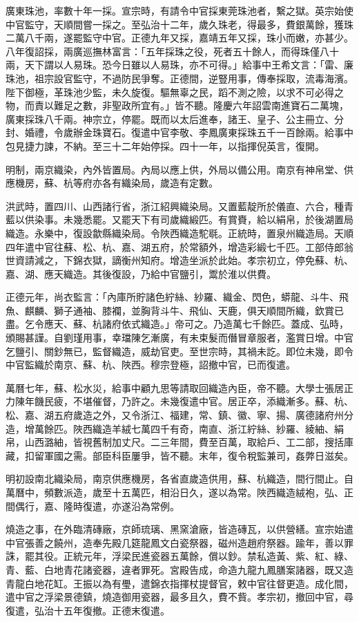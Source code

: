 廣東珠池，率數十年一採。宣宗時，有請令中官採東莞珠池者，繫之獄。英宗始使中官監守，天順間嘗一採之。至弘治十二年，歲久珠老，得最多，費銀萬餘，獲珠二萬八千兩，遂罷監守中官。正德九年又採，嘉靖五年又採，珠小而嫩，亦甚少。八年復詔採，兩廣巡撫林富言：「五年採珠之役，死者五十餘人，而得珠僅八十兩，天下謂以人易珠。恐今日雖以人易珠，亦不可得。」給事中王希文言：「雷、廉珠池，祖宗設官監守，不過防民爭奪。正德間，逆豎用事，傳奉採取，流毒海濱。陛下御極，革珠池少監，未久旋復。驅無辜之民，蹈不測之險，以求不可必得之物，而責以難足之數，非聖政所宜有。」皆不聽。隆慶六年詔雲南進寶石二萬塊，廣東採珠八千兩。神宗立，停罷。既而以太后進奉，諸王、皇子、公主冊立、分封、婚禮，令歲辦金珠寶石。復遣中官李敬、李鳳廣東採珠五千一百餘兩。給事中包見捷力諫，不納。至三十二年始停採。四十一年，以指揮倪英言，復開。

明制，兩京織染，內外皆置局。內局以應上供，外局以備公用。南京有神帛堂、供應機房，蘇、杭等府亦各有織染局，歲造有定數。

洪武時，置四川、山西諸行省，浙江紹興織染局。又置藍靛所於儀直、六合，種青藍以供染事。未幾悉罷。又罷天下有司歲織緞匹。有賞賚，給以絹帛，於後湖置局織造。永樂中，復設歙縣織染局。令陜西織造駝毼。正統時，置泉州織造局。天順四年遣中官往蘇、松、杭、嘉、湖五府，於常額外，增造彩緞七千匹。工部侍郎翁世資請減之，下錦衣獄，謫衡州知府。增造坐派於此始。孝宗初立，停免蘇、杭、嘉、湖、應天織造。其後復設，乃給中官鹽引，鬻於淮以供費。

正德元年，尚衣監言：「內庫所貯諸色紵絲、紗羅、織金、閃色，蟒龍、斗牛、飛魚、麒麟、獅子通袖、膝襴，並胸背斗牛、飛仙、天鹿，俱天順間所織，欽賞已盡。乞令應天、蘇、杭諸府依式織造。」帝可之。乃造萬七千餘匹。蓋成、弘時，頒賜甚謹。自劉瑾用事，幸璫陳乞漸廣，有未束髮而僭冒章服者，濫賞日增。中官乞鹽引、關鈔無已，監督織造，威劫官吏。至世宗時，其禍未訖。即位未幾，即令中官監織於南京、蘇、杭、陜西。穆宗登極，詔撤中官，已而復遣。

萬曆七年，蘇、松水災，給事中顧九思等請取回織造內臣，帝不聽。大學士張居正力陳年饑民疲，不堪催督，乃許之。未幾復遣中官。居正卒，添織漸多。蘇、杭、松、嘉、湖五府歲造之外，又令浙江、福建，常、鎮、徽、寧、揚、廣德諸府州分造，增萬餘匹。陜西織造羊絨七萬四千有奇，南直、浙江紵絲、紗羅、綾紬、絹帛，山西潞紬，皆視舊制加丈尺。二三年間，費至百萬，取給戶、工二部，搜括庫藏，扣留軍國之需。部臣科臣屢爭，皆不聽。末年，復令稅監兼司，姦弊日滋矣。

明初設南北織染局，南京供應機房，各省直歲造供用，蘇、杭織造，間行間止。自萬曆中，頻數派造，歲至十五萬匹，相沿日久，遂以為常。陜西織造絨袍，弘、正間偶行，嘉、隆時復遣，亦遂沿為常例。

燒造之事，在外臨清磚廠，京師琉璃、黑窯滄廠，皆造磚瓦，以供營繕。宣宗始遣中官張善之饒州，造奉先殿几筵龍鳳文白瓷祭器，磁州造趙府祭器。踰年，善以罪誅，罷其役。正統元年，浮梁民進瓷器五萬餘，償以鈔。禁私造黃、紫、紅、綠、青、藍、白地青花諸瓷器，違者罪死。宮殿告成，命造九龍九鳳膳案諸器，既又造青龍白地花缸。王振以為有璺，遣錦衣指揮杖提督官，敕中官往督更造。成化間，遣中官之浮梁景德鎮，燒造御用瓷器，最多且久，費不貲。孝宗初，撤回中官，尋復遣，弘治十五年復撤。正德末復遣。

